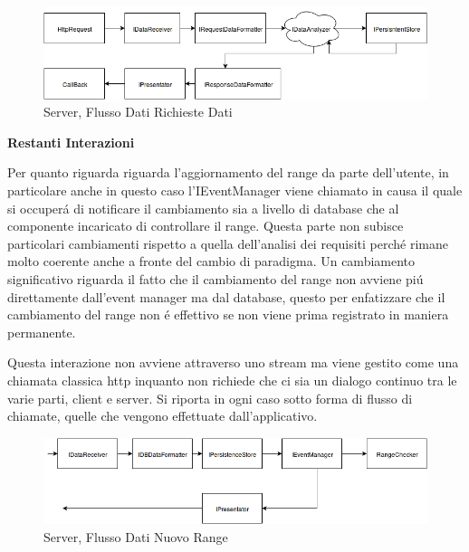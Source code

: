 \begin{figure}[h]
\centering
\includegraphics[width=\textwidth]{Figures/LogicArchitecture/Server/FlowDiagramViewData}
\caption{Server, Flusso Dati Richieste Dati}
\end{figure}

\begin{center}
  \textbf{Restanti Interazioni}
\end{center}

Per quanto riguarda  riguarda l'aggiornamento del range da parte dell'utente, in particolare anche in questo caso l'IEventManager viene chiamato in causa il quale si occuper\'a di notificare il cambiamento sia a livello di database che al componente incaricato di controllare il range. Questa parte non subisce particolari cambiamenti rispetto a quella dell'analisi dei requisiti perch\'e rimane molto coerente anche a fronte del cambio di paradigma. Un cambiamento significativo riguarda il fatto che il cambiamento del range non avviene pi\'u direttamente dall'event manager ma dal database, questo per enfatizzare che il cambiamento del range non \'e effettivo se non viene prima registrato in maniera permanente.

Questa interazione non avviene attraverso uno stream ma viene gestito come una chiamata classica http inquanto non richiede che ci sia un dialogo continuo tra le varie parti, client e server. Si riporta in ogni caso sotto forma di flusso di chiamate, quelle che vengono effettuate dall'applicativo.

\begin{figure}[h]
\centering
\includegraphics[width=\textwidth]{Figures/LogicArchitecture/Server/FlowDiagramNewRange}
\caption{Server, Flusso Dati Nuovo Range}
\end{figure}

\newpage


